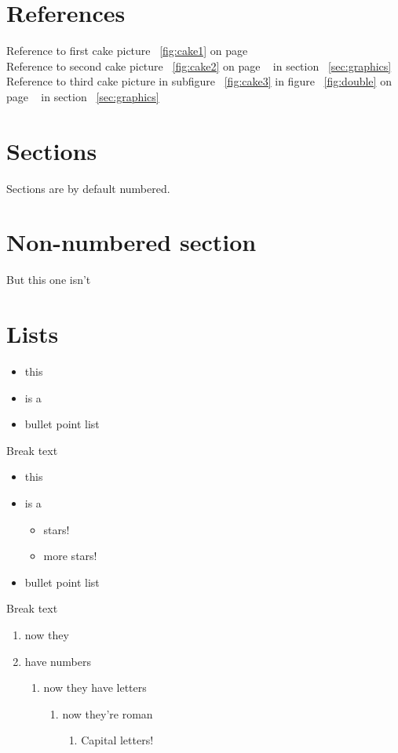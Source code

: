 \documentclass[a4paper,12pt]{article}
\begin{document}
\section{References}
Reference to first cake picture  ~\ref{fig:cake1} on page ~\pageref{fig:cake1} \\
Reference to second cake picture ~\ref{fig:cake2} on page ~\pageref{fig:cake2} in section ~\ref{sec:graphics} \\
Reference to third cake picture in subfigure ~\ref{fig:cake3} in  figure ~\ref{fig:double} on page ~\pageref{fig:cake3} in section ~\ref{sec:graphics}

\section{Sections}
Sections are by default numbered.
\section*{Non-numbered section}
But this one isn't
\section{Lists}
\begin{itemize}
\item this
\item is a
\item bullet point list
\end{itemize}
Break text
\begin{itemize}
\item this 
\item is a 
	\begin{itemize}
		\item stars!
		\item more stars!
	\end{itemize}
\item bullet point list
\end{itemize}
Break text
\begin{enumerate}
\item now they
\item have numbers
	\begin{enumerate}
	\item now they have letters
		\begin{enumerate}
		\item now they're roman
			\begin{enumerate}
			\item Capital letters!
			\end{enumerate}
		\end{enumerate}
	\end{enumerate}
\end{enumerate}
\clearpage
\end{document}
